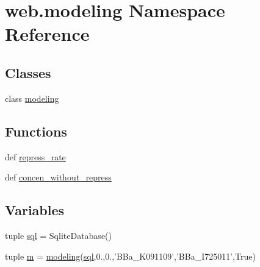 \hypertarget{namespaceweb_1_1modeling}{\section{web.\-modeling Namespace Reference}
\label{namespaceweb_1_1modeling}
}
\subsection*{Classes}
\begin{DoxyCompactItemize}
\item 
class \hyperlink{classweb_1_1modeling_1_1modeling}{modeling}
\end{DoxyCompactItemize}
\subsection*{Functions}
\begin{DoxyCompactItemize}
\item 
def \hyperlink{namespaceweb_1_1modeling_a7a8fde3dbbd2db97c15de3b897a5dac7}{repress\-\_\-rate}
\item 
def \hyperlink{namespaceweb_1_1modeling_a89e6192003662f6b3a876ff7bb94fd3a}{concen\-\_\-without\-\_\-repress}
\end{DoxyCompactItemize}
\subsection*{Variables}
\begin{DoxyCompactItemize}
\item 
tuple \hyperlink{namespaceweb_1_1modeling_a5d36bb88ac240bdc558e50c0262671f8}{sql} = Sqlite\-Database()
\item 
tuple \hyperlink{namespaceweb_1_1modeling_a1bc5ee3cb21ab5b881af5cb7caa7a256}{m} = \hyperlink{classweb_1_1modeling_1_1modeling}{modeling}(\hyperlink{namespaceweb_1_1modeling_a5d36bb88ac240bdc558e50c0262671f8}{sql},0.,0.,'B\-Ba\-\_\-\-K091109','B\-Ba\-\_\-\-I725011',True)
\end{DoxyCompactItemize}



